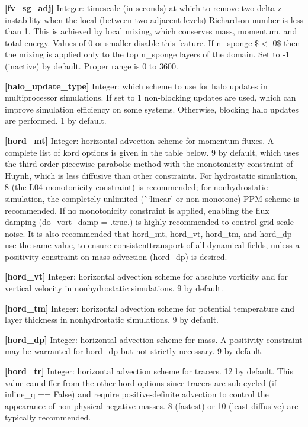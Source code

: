 {\bfseries \mbox{[}fv\+\_\+sg\+\_\+adj\mbox{]}} Integer\+: timescale (in seconds) at which to remove two-\/delta-\/z instability when the local (between two adjacent levels) Richardson number is less than 1. This is achieved by local mixing, which conserves mass, momentum, and total energy. Values of 0 or smaller disable this feature. If n\+\_\+sponge \$$<$ 0\$ then the mixing is applied only to the top n\+\_\+sponge layers of the domain. Set to -\/1 (inactive) by default. Proper range is 0 to 3600.

{\bfseries \mbox{[}halo\+\_\+update\+\_\+type\mbox{]}} Integer\+: which scheme to use for halo updates in multiprocessor simulations. If set to 1 non-\/blocking updates are used, which can improve simulation efficiency on some systems. Otherwise, blocking halo updates are performed. 1 by default.

{\bfseries \mbox{[}hord\+\_\+mt\mbox{]}} Integer\+: horizontal advection scheme for momentum fluxes. A complete list of kord options is given in the table below. 9 by default, which uses the third-\/order piecewise-\/parabolic method with the monotonicity constraint of Huynh, which is less diffusive than other constraints. For hydrostatic simulation, 8 (the L04 monotonicity constraint) is recommended; for nonhydrostatic simulation, the completely unlimited (\`{}`linear'\textquotesingle{} or non-\/monotone) P\+PM scheme is recommended. If no monotonicity constraint is applied, enabling the flux damping (do\+\_\+vort\+\_\+damp = .true.) is highly recommended to control grid-\/scale noise. It is also recommended that hord\+\_\+mt, hord\+\_\+vt, hord\+\_\+tm, and hord\+\_\+dp use the same value, to ensure consistenttransport of all dynamical fields, unless a positivity constraint on mass advection (hord\+\_\+dp) is desired.

{\bfseries \mbox{[}hord\+\_\+vt\mbox{]}} Integer\+: horizontal advection scheme for absolute vorticity and for vertical velocity in nonhydrostatic simulations. 9 by default.

{\bfseries \mbox{[}hord\+\_\+tm\mbox{]}} Integer\+: horizontal advection scheme for potential temperature and layer thickness in nonhydrostatic simulations. 9 by default.

{\bfseries \mbox{[}hord\+\_\+dp\mbox{]}} Integer\+: horizontal advection scheme for mass. A positivity constraint may be warranted for hord\+\_\+dp but not strictly necessary. 9 by default.

{\bfseries \mbox{[}hord\+\_\+tr\mbox{]}} Integer\+: horizontal advection scheme for tracers. 12 by default. This value can differ from the other hord options since tracers are sub-\/cycled (if inline\+\_\+q == False) and require positive-\/definite advection to control the appearance of non-\/physical negative masses. 8 (fastest) or 10 (least diffusive) are typically recommended.

